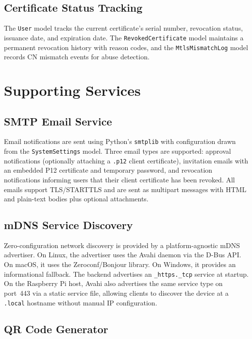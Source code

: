 \documentclass[12pt,letterpaper]{report}
\begin{document}
\subsection{Certificate Status Tracking}

The \texttt{User} model tracks the current certificate's serial number, revocation status, issuance date, and expiration date. The \texttt{RevokedCertificate} model maintains a permanent revocation history with reason codes, and the \texttt{MtlsMismatchLog} model records CN mismatch events for abuse detection.

\section{Supporting Services}

\subsection{SMTP Email Service}

Email notifications are sent using Python's \texttt{smtplib} with configuration drawn from the \texttt{SystemSettings} model. Three email types are supported: approval notifications (optionally attaching a \texttt{.p12} client certificate), invitation emails with an embedded P12 certificate and temporary password, and revocation notifications informing users that their client certificate has been revoked. All emails support TLS/STARTTLS and are sent as multipart messages with HTML and plain-text bodies plus optional attachments.

\subsection{mDNS Service Discovery}

Zero-configuration network discovery is provided by a platform-agnostic mDNS advertiser. On Linux, the advertiser uses the Avahi daemon via the D-Bus API. On macOS, it uses the Zeroconf/Bonjour library. On Windows, it provides an informational fallback. The backend advertises an \texttt{\_https.\_tcp} service at startup. On the Raspberry Pi host, Avahi also advertises the same service type on port~443 via a static service file, allowing clients to discover the device at a \texttt{.local} hostname without manual IP configuration.

\subsection{QR Code Generator}
\end{document}
